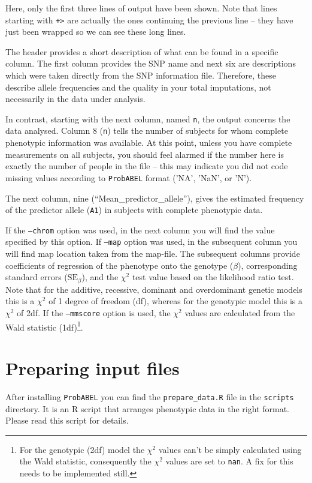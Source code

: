 \documentclass[12pt,a4paper]{article}
\newcommand{\PA}{\texttt{ProbABEL}}
\begin{document}
Here, only the first three lines of output have been shown. Note that lines
starting with \texttt{+>} are actually the ones continuing the
previous line -- they have just been wrapped so we can see
these long lines.

The header provides a short description of what can be found in a
specific column. The first column provides the SNP name and
next six are descriptions which were taken directly from the
SNP information file. Therefore, these describe allele frequencies and
the quality in your total imputations, not necessarily in the data under
analysis.

In contrast, starting with the next column, named \texttt{n},
the output concerns the data analysed. Column 8 (\texttt{n}) tells the
number of subjects for whom complete phenotypic information was
available. At this point, unless you have complete measurements on all
subjects, you should feel alarmed if the number here is exactly the
number of people in the file -- this may indicate you did not code
missing values according to \PA{} format ('NA', 'NaN', or 'N').

The next column, nine (``Mean\_predictor\_allele''), gives the estimated
frequency of the predictor allele (\texttt{A1}) in subjects with complete
phenotypic data.

If the \texttt{--chrom} option was used, in the next column you will
find the value specified by this option. If \texttt{--map} option was
used, in the subsequent column you will find map location taken from
the map-file. The subsequent columns provide coefficients of
regression of the phenotype onto the genotype ($\beta$), corresponding
standard errors ($\text{SE}_\beta$), and the $\chi^2$ test value based
on the likelihood ratio test. Note that for the additive, recessive,
dominant and overdominant genetic models this is a $\chi^2$ of 1
degree of freedom (df), whereas for the genotypic model this is a
$\chi^2$ of 2df. If the \texttt{--mmscore} option is used, the
$\chi^2$ values are calculated from the Wald statistic
(1df)\footnote{For the genotypic (2df) model the $\chi^2$ values can't
  be simply calculated using the Wald statistic, consequently the
  $\chi^2$ values are set to \texttt{nan}. A fix for this needs to be
  implemented still.}.

\section{Preparing input files}
After installing \PA{} you can find the \texttt{prepare\_data.R} file
in the \texttt{scripts} directory. It is an R script that arranges
phenotypic data in the right format. Please read this script for
details.
\end{document}
